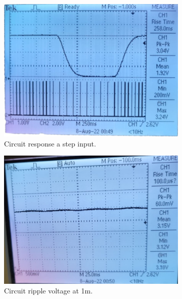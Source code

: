 \begin{figure}[H]
\centering
\begin{subfigure}[]{0.45\textwidth}
\includegraphics[width=\linewidth]{./Figures/SonicSens_Prac_Step.jpeg}
\caption{Circuit response a step input.}
\label{subfig:sonicsen_prac_step}	
\end{subfigure}
\hfill
\begin{subfigure}[]{0.45\textwidth}
\includegraphics[width=\linewidth]{./Figures/SonicSens_Prac_Ripple.jpeg}
\caption{Circuit ripple voltage at 1m.} 			
\label{subfig:sonicsen_prac_ripple}	
\end{subfigure}
\vfill
\begin{subfigure}[]{0.45\textwidth}

\end{subfigure}
\end{figure}
